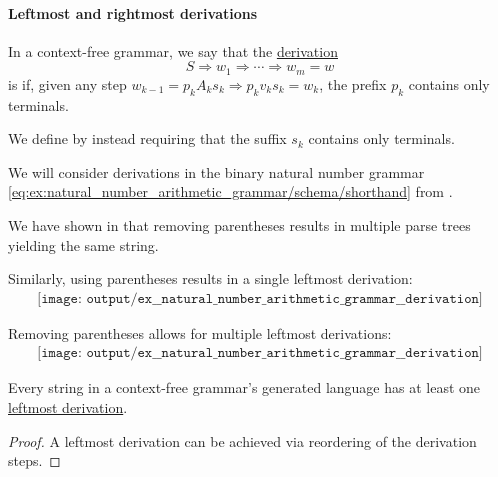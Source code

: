 \paragraph{Leftmost and rightmost derivations}

\begin{definition}\label{def:leftmost_derivation}
  In a context-free grammar, we say that the \hyperref[def:formal_grammar/derivation]{derivation}
  \begin{equation*}
    S \Rightarrow w_1 \Rightarrow \cdots \Rightarrow w_m = w
  \end{equation*}
  is  if, given any step \( w_{k-1} = p_k A_k s_k \Rightarrow p_k v_k s_k = w_k \), the prefix \( p_k \) contains only terminals.

  We define  by instead requiring that the suffix \( s_k \) contains only terminals.
\end{definition}

\begin{example}\label{ex:natural_number_arithmetic_grammar/derivation}
  We will consider derivations in the binary natural number grammar \eqref{eq:ex:natural_number_arithmetic_grammar/schema/shorthand} from .

  We have shown in  that removing parentheses results in multiple parse trees yielding the same string.

  Similarly, using parentheses results in a single leftmost derivation:
  \begin{equation*}
    \begin{aligned}
      \texttt{[image: output/ex\_\_natural\_number\_arithmetic\_grammar\_\_derivation]}
    \end{aligned}
  \end{equation*}

  Removing parentheses allows for multiple leftmost derivations:
  \begin{equation*}
    \begin{aligned}
      \texttt{[image: output/ex\_\_natural\_number\_arithmetic\_grammar\_\_derivation]}
    \end{aligned}
  \end{equation*}
\end{example}

\begin{proposition}\label{thm:leftmost_derivation_existence}
  Every string in a context-free grammar's generated language has at least one \hyperref[def:leftmost_derivation]{leftmost derivation}.
\end{proposition}
\begin{proof}
  A leftmost derivation can be achieved via reordering of the derivation steps.
\end{proof}

